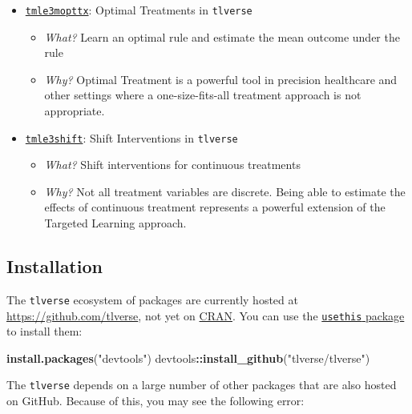 \documentclass[12pt, krantz2,]{krantz}
\newenvironment{Shaded}{\begin{snugshade}}{\end{snugshade}}
\newcommand{\KeywordTok}[1]{\textcolor[rgb]{0.27,0.27,0.27}{\textbf{#1}}}
\newcommand{\NormalTok}[1]{#1}
\newcommand{\OperatorTok}[1]{\textcolor[rgb]{0.43,0.43,0.43}{\textbf{#1}}}
\newcommand{\StringTok}[1]{\textcolor[rgb]{0.5,0.5,0.5}{#1}}
\providecommand{\tightlist}{%
  \setlength{\itemsep}{0pt}\setlength{\parskip}{0pt}}
\theoremstyle{definition}
\theoremstyle{definition}
\theoremstyle{definition}
\newcommand{\1}{\mathbbm{1}}
\begin{document}
\begin{itemize}
\tightlist
\item
  \href{https://github.com/tlverse/tmle3mopttx}{\texttt{tmle3mopttx}}: Optimal Treatments
  in \texttt{tlverse}

  \begin{itemize}
  \tightlist
  \item
    \emph{What?} Learn an optimal rule and estimate the mean outcome under the rule
  \item
    \emph{Why?} Optimal Treatment is a powerful tool in precision healthcare and
    other settings where a one-size-fits-all treatment approach is not
    appropriate.
  \end{itemize}
\item
  \href{https://github.com/tlverse/tmle3shift}{\texttt{tmle3shift}}: Shift Interventions in
  \texttt{tlverse}

  \begin{itemize}
  \tightlist
  \item
    \emph{What?} Shift interventions for continuous treatments
  \item
    \emph{Why?} Not all treatment variables are discrete. Being able to estimate the
    effects of continuous treatment represents a powerful extension of the
    Targeted Learning approach.
  \end{itemize}
\end{itemize}

\hypertarget{installtlverse}{%
\subsection{Installation}\label{installtlverse}}

The \texttt{tlverse} ecosystem of packages are currently hosted at
\url{https://github.com/tlverse}, not yet on \href{https://CRAN.R-project.org/}{CRAN}. You
can use the \href{https://usethis.r-lib.org/}{\texttt{usethis} package} to install them:

\begin{Shaded}
\begin{Highlighting}[]
\KeywordTok{install.packages}\NormalTok{(}\StringTok{"devtools"}\NormalTok{)}
\NormalTok{devtools}\OperatorTok{::}\KeywordTok{install_github}\NormalTok{(}\StringTok{"tlverse/tlverse"}\NormalTok{)}
\end{Highlighting}
\end{Shaded}

The \texttt{tlverse} depends on a large number of other packages that are also hosted
on GitHub. Because of this, you may see the following error:
\end{document}
